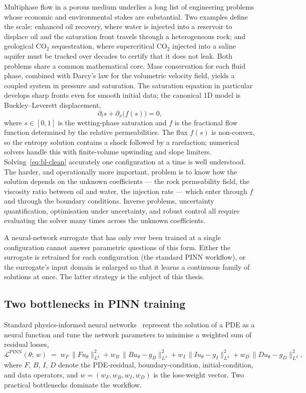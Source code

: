 \documentclass[12pt,a4paper]{extarticle}
\begin{document}
Multiphase flow in a porous medium underlies a long list of engineering problems whose economic and environmental stakes are substantial. Two examples define the scale: enhanced oil recovery, where water is injected into a reservoir to displace oil and the saturation front travels through a heterogeneous rock; and geological CO$_2$ sequestration, where supercritical CO$_2$ injected into a saline aquifer must be tracked over decades to certify that it does not leak. Both problems share a common mathematical core. Mass conservation for each fluid phase, combined with Darcy's law for the volumetric velocity field, yields a coupled system in pressure and saturation. The saturation equation in particular develops sharp fronts even for smooth initial data; the canonical 1D model is Buckley--Leverett displacement,
\begin{equation}
    \partial_t s + \partial_x \!\bigl( f(s) \bigr) = 0,
    \label{eq:bl-clean}
\end{equation}
where $s \in [0, 1]$ is the wetting-phase saturation and $f$ is the fractional flow function determined by the relative permeabilities. The flux $f(s)$ is non-convex, so the entropy solution contains a shock followed by a rarefaction; numerical solvers handle this with finite-volume upwinding and slope limiters. Solving~\eqref{eq:bl-clean} accurately one configuration at a time is well understood. The harder, and operationally more important, problem is to know how the solution depends on the unknown coefficients --- the rock permeability field, the viscosity ratio between oil and water, the injection rate --- which enter through $f$ and through the boundary conditions. Inverse problems, uncertainty quantification, optimisation under uncertainty, and robust control all require evaluating the solver many times across the unknown coefficients.

A neural-network surrogate that has only ever been trained at a single configuration cannot answer parametric questions of this form. Either the surrogate is retrained for each configuration (the standard PINN workflow), or the surrogate's input domain is enlarged so that it learns a continuous family of solutions at once. The latter strategy is the subject of this thesis.

\subsection{Two bottlenecks in PINN training}

Standard physics-informed neural networks~\cite{lagaris1998artificial, raissi2019physics} represent the solution of a PDE as a neural function and tune the network parameters to minimise a weighted sum of residual losses,
\begin{equation}
    \mathcal{L}^{\mathrm{PINN}}(\theta;\, w) \;=\; w_F\,\|F u_\theta\|_{L^2}^2 + w_B\,\|B u_\theta - g_B\|_{L^2}^2 + w_I\,\|I u_\theta - g_I\|_{L^2}^2 + w_D\,\|D u_\theta - g_D\|_{L^2}^2,
    \label{eq:pinn-loss}
\end{equation}
where $F$, $B$, $I$, $D$ denote the PDE-residual, boundary-condition, initial-condition, and data operators, and $w = (w_F, w_B, w_I, w_D)$ is the loss-weight vector. Two practical bottlenecks dominate the workflow.
\end{document}
